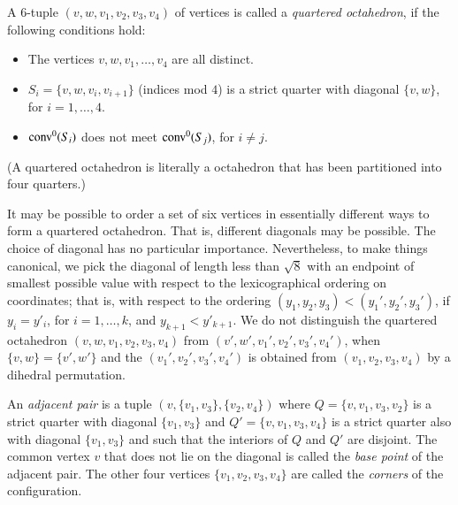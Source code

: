 \begin{definition}  A $6$-tuple $(v,w,v_1,v_2,v_3,v_4)$ of vertices is
called a {\it quartered  octahedron}, if the
following conditions hold:
    \begin{itemize}
    \item The vertices $v,w,v_1,\ldots,v_4$ are all distinct.
    \item $S_i = \{v,w,v_i,v_{i+1}\}$ (indices mod $4$) is a
    strict quarter with diagonal $\{v,w\}$, for $i=1,\ldots,4$.
    \item ${\operatorname{conv}}^0(S_i)$ does not meet ${\operatorname{conv}}^0(S_j)$, for $i\ne j$.
    \end{itemize}
(A quartered octahedron is literally a octahedron that has been
partitioned into four quarters.)
\end{definition}

\begin{remark}\label{def:oct-order}
It may be possible to order a set of six vertices in essentially
different ways to form a quartered octahedron.  That is, different
diagonals may be possible.    The choice of diagonal has no
particular importance.
%
Nevertheless, to make things canonical, we
pick the diagonal of length less than $\sqrt8$ with an endpoint of
smallest possible value with respect to the lexicographical
ordering on coordinates; that is, with respect to the ordering
$(y_1,y_2,y_3) < (y_1',y_2',y_3')$, if $y_i=y'_i$, for
$i=1,\ldots,k$, and $y_{k+1}<y'_{k+1}$.  
%
We do not distinguish the quartered octahedron
$(v,w,v_1,v_2,v_3,v_4)$ from $(v',w',v_1',v_2',v_3',v_4')$, when
$\{v,w\} = \{v',w'\}$ and the $(v_1',v_2',v_3',v_4')$ is obtained
from $(v_1,v_2,v_3,v_4)$ by a dihedral permutation.
\end{remark}




\begin{definition}\label{def:adj-pair}\label{def:corner}
An {\it adjacent pair} is a tuple
$(v,\{v_1,v_3\},\{v_2,v_4\})$ where $Q=\{v,v_1,v_3,v_2\}$ is a
strict quarter with diagonal $\{v_1,v_3\}$ and
$Q'=\{v,v_1,v_3,v_4\}$ is a strict quarter also with diagonal
$\{v_1,v_3\}$ and such that the interiors of $Q$ and $Q'$ are
disjoint.  The common vertex $v$ that does not lie on the diagonal
is called the {\it base point\/} of the adjacent pair.   The other
four vertices $\{v_1,v_2,v_3,v_4\}$ are called the {\it corners\/}
of the configuration.
%
\end{definition}



